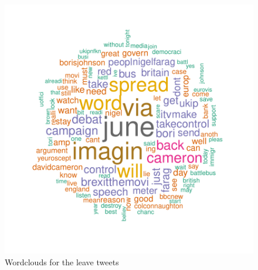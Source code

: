 \documentclass[10pt]{article}
\begin{document}
\begin{figure}[H]
\begin{center}
\begin{Schunk}
\end{Schunk}
\includegraphics{submission-029}
\caption {Wordclouds for the leave tweets}
\label{fig11}
\end {center}
\end {figure}
\end{document}
